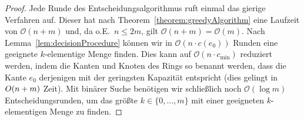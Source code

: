 \begin{proof}
    Jede Runde des Entscheidungsalgorithmus ruft einmal das gierige Verfahren auf.
    Dieser hat nach Theorem~\ref{theorem:greedyAlgorithm} eine Laufzeit von $\mathcal O(n+m)$ und, da o.E.\
    $n \leq 2m$, gilt $\mathcal O(n+m) = \mathcal O(m)$.
    Nach Lemma~\ref{lem:decisionProcedure} können wir in $\mathcal O(n \cdot c(e_0))$ Runden eine geeignete $k$-elementige Menge finden.
    Dies kann auf $\mathcal O(n \cdot c_{\min})$ reduziert werden, indem die Kanten und Knoten des Rings so benannt werden, dass
    die Kante $e_0$ derjenigen mit der geringsten Kapazität entspricht (dies gelingt in $\mathcal \mathcal O(n+m)$ Zeit).
    Mit binärer Suche benötigen wir schließlich noch $\mathcal O(\log m)$ Entscheidungsrunden, um das größte $k \in \{0, \dots, m\}$
    mit einer geeigneten $k$-elementigen Menge zu finden.
\end{proof}













